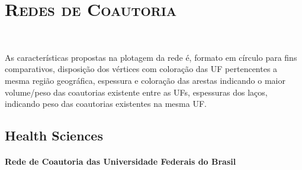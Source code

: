 \chapter{\textsc{Redes de Coautoria}}~\label{redes}

As características propostas na plotagem da rede é, formato em círculo para fins comparativos, disposição dos vértices com coloração das UF pertencentes a mesma região geográfica, espessura e coloração das arestas indicando o maior volume/peso das coautorias existente entre as UFs, espessuras dos laços, indicando peso das coautorias existentes na mesma UF.


\section{\textbf{Health Sciences}}

\subsubsection{Rede de Coautoria das Universidade Federais do Brasil}


